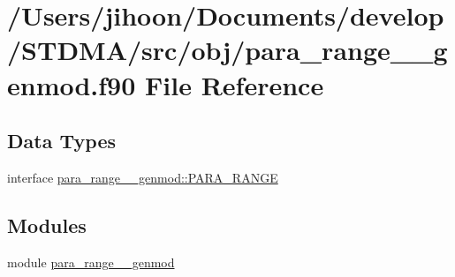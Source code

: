 \hypertarget{para__range____genmod_8f90}{}\section{/\+Users/jihoon/\+Documents/develop/\+S\+T\+D\+M\+A/src/obj/para\+\_\+range\+\_\+\+\_\+genmod.f90 File Reference}
\label{para__range____genmod_8f90}
\subsection*{Data Types}
\begin{DoxyCompactItemize}
\item 
interface \mbox{\hyperlink{interfacepara__range____genmod_1_1_p_a_r_a___r_a_n_g_e}{para\+\_\+range\+\_\+\+\_\+genmod\+::\+P\+A\+R\+A\+\_\+\+R\+A\+N\+GE}}
\end{DoxyCompactItemize}
\subsection*{Modules}
\begin{DoxyCompactItemize}
\item 
module \mbox{\hyperlink{namespacepara__range____genmod}{para\+\_\+range\+\_\+\+\_\+genmod}}
\end{DoxyCompactItemize}

